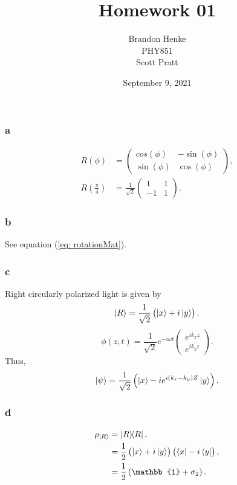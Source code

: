 \documentclass[a4paper,12pt,twoside]{article}
\title{Homework 01}
\author{Brandon Henke\\PHY851\\Scott Pratt}
\date{September 9, 2021}
\begin{document}

\maketitle
\begin{multicols*}{2}


\subsection{}%
\subsubsection*{a}
\begin{align}
    R(\phi) &= \begin{pmatrix}
        cos(\phi) & -\sin(\phi)\\
        \sin(\phi) & \cos(\phi)
    \end{pmatrix},
    \label{eq: rotationMat}\\
    R\left(\frac{\pi}{4}\right) &= \frac{1}{\sqrt{2}}\begin{pmatrix}
        1 & 1 \\ -1 & 1
    \end{pmatrix}.
\end{align}
\subsubsection*{b}
See equation (\ref{eq: rotationMat}).
\subsubsection*{c}
Right circularly polarized light is given by
\begin{equation}
    \ket{R} = \frac{1}{\sqrt{2}}\left( \ket{x}+i\ket{y} \right).
\end{equation}
\begin{equation}
    \phi(z,t) = \frac{1}{\sqrt{2}}e^{-i\omega t}\begin{pmatrix}
    e^{i k_x z} \\ e^{i k_y z}
    \end{pmatrix}.
\end{equation}
Thus,
\begin{equation}
    \ket{\psi} = \frac{1}{\sqrt{2}} \left( \ket{x} - i e^{i(k_x-k_y)Z}\ket{y} \right).
\end{equation}
\subsubsection*{d}
\begin{align}
    \rho_{\ket{R}} &= \op{R},\\
    &= \frac{1}{2} \left( \ket{x} + i\ket{y} \right)\left( \bra{x} - i\bra{y} \right),\\
    &= \frac{1}{2} \left( \mathbb{1} + \sigma_2 \right).
\end{align}

\end{multicols*}
\end{document}
